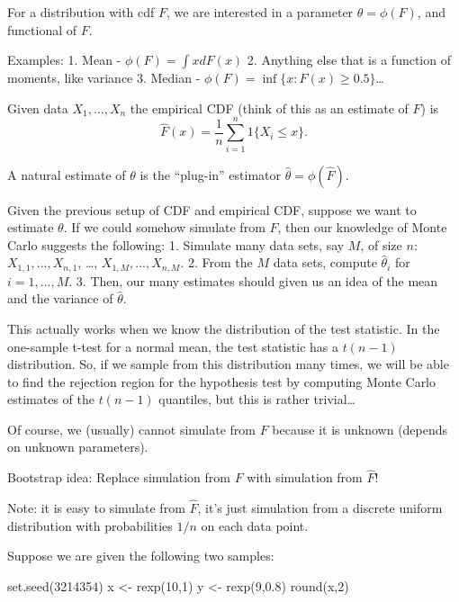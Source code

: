 \documentclass[
]{book}
\newenvironment{Shaded}{\begin{snugshade}}{\end{snugshade}}
\newcommand{\DecValTok}[1]{\textcolor[rgb]{0.00,0.00,0.81}{#1}}
\newcommand{\FloatTok}[1]{\textcolor[rgb]{0.00,0.00,0.81}{#1}}
\newcommand{\FunctionTok}[1]{\textcolor[rgb]{0.00,0.00,0.00}{#1}}
\newcommand{\NormalTok}[1]{#1}
\newcommand{\OtherTok}[1]{\textcolor[rgb]{0.56,0.35,0.01}{#1}}
\begin{document}
For a distribution with cdf \(F\), we are interested in a parameter \(\theta = \phi(F)\), and functional of \(F\).

Examples:
1. Mean - \(\phi(F) = \int xdF(x)\)
2. Anything else that is a function of moments, like variance
3. Median - \(\phi(F) = \inf\{x: F(x)\geq 0.5\}\)\ldots{}

Given data \(X_1, ..., X_n\) the empirical CDF (think of this as an estimate of \(F\)) is
\[\hat F(x) = \frac{1}{n}\sum_{i=1}^n 1\{X_i \leq x\}.\]

A natural estimate of \(\theta\) is the ``plug-in'' estimator \(\hat\theta = \phi(\hat F)\).

Given the previous setup of CDF and empirical CDF, suppose we want to estimate \(\theta\). If we could somehow simulate from \(F\), then our knowledge of Monte Carlo suggests the following:
1. Simulate many data sets, say \(M\), of size \(n\): \(X_{1,1}, ..., X_{n,1}\), \ldots, \(X_{1,M}, ..., X_{n,M}\).
2. From the \(M\) data sets, compute \(\hat{\theta}_i\) for \(i=1, ..., M\).
3. Then, our many estimates should given us an idea of the mean and the variance of \(\hat{\theta}\).

This actually works when we know the distribution of the test statistic. In the one-sample t-test for a normal mean, the test statistic has a \(t(n-1)\) distribution. So, if we sample from this distribution many times, we will be able to find the rejection region for the hypothesis test by computing Monte Carlo estimates of the \(t(n-1)\) quantiles, but this is rather trivial\ldots{}

Of course, we (usually) cannot simulate from \(F\) because it is unknown (depends on unknown parameters).

Bootstrap idea: Replace simulation from \(F\) with simulation from \(\hat F\)!

Note: it is easy to simulate from \(\hat F\), it's just simulation from a discrete uniform distribution with probabilities \(1/n\) on each data point.

Suppose we are given the following two samples:

\begin{Shaded}
\begin{Highlighting}[]
\FunctionTok{set.seed}\NormalTok{(}\DecValTok{3214354}\NormalTok{)}
\NormalTok{x }\OtherTok{\textless{}{-}} \FunctionTok{rexp}\NormalTok{(}\DecValTok{10}\NormalTok{,}\DecValTok{1}\NormalTok{)}
\NormalTok{y }\OtherTok{\textless{}{-}} \FunctionTok{rexp}\NormalTok{(}\DecValTok{9}\NormalTok{,}\FloatTok{0.8}\NormalTok{)}
\FunctionTok{round}\NormalTok{(x,}\DecValTok{2}\NormalTok{)}
\end{Highlighting}
\end{Shaded}
\end{document}
